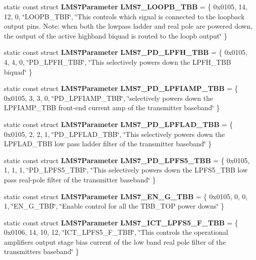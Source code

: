 \begin{DoxyCompactItemize}
\item 
static const struct {\bf L\+M\+S7\+Parameter} {\bf L\+M\+S7\+\_\+\+L\+O\+O\+P\+B\+\_\+\+T\+BB} = \{ 0x0105, 14, 12, 0, \char`\"{}\+L\+O\+O\+P\+B\+\_\+\+T\+B\+B\char`\"{}, \char`\"{}\+This controls which signal is connected to the loopback output pins. Note\+: when both the lowpass ladder and real pole are powered down, the output of the active highband biquad is routed to the loopb output\char`\"{} \}
\item 
static const struct {\bf L\+M\+S7\+Parameter} {\bf L\+M\+S7\+\_\+\+P\+D\+\_\+\+L\+P\+F\+H\+\_\+\+T\+BB} = \{ 0x0105, 4, 4, 0, \char`\"{}\+P\+D\+\_\+\+L\+P\+F\+H\+\_\+\+T\+B\+B\char`\"{}, \char`\"{}\+This selectively powers down the L\+P\+F\+H\+\_\+\+T\+B\+B biquad\char`\"{} \}
\item 
static const struct {\bf L\+M\+S7\+Parameter} {\bf L\+M\+S7\+\_\+\+P\+D\+\_\+\+L\+P\+F\+I\+A\+M\+P\+\_\+\+T\+BB} = \{ 0x0105, 3, 3, 0, \char`\"{}\+P\+D\+\_\+\+L\+P\+F\+I\+A\+M\+P\+\_\+\+T\+B\+B\char`\"{}, \char`\"{}selectively powers down the L\+P\+F\+I\+A\+M\+P\+\_\+\+T\+B\+B front-\/end current amp of the transmitter baseband\char`\"{} \}
\item 
static const struct {\bf L\+M\+S7\+Parameter} {\bf L\+M\+S7\+\_\+\+P\+D\+\_\+\+L\+P\+F\+L\+A\+D\+\_\+\+T\+BB} = \{ 0x0105, 2, 2, 1, \char`\"{}\+P\+D\+\_\+\+L\+P\+F\+L\+A\+D\+\_\+\+T\+B\+B\char`\"{}, \char`\"{}\+This selectively powers down the L\+P\+F\+L\+A\+D\+\_\+\+T\+B\+B low pass ladder filter of the transmitter baseband\char`\"{} \}
\item 
static const struct {\bf L\+M\+S7\+Parameter} {\bf L\+M\+S7\+\_\+\+P\+D\+\_\+\+L\+P\+F\+S5\+\_\+\+T\+BB} = \{ 0x0105, 1, 1, 1, \char`\"{}\+P\+D\+\_\+\+L\+P\+F\+S5\+\_\+\+T\+B\+B\char`\"{}, \char`\"{}\+This selectively powers down the L\+P\+F\+S5\+\_\+\+T\+B\+B low pass real-\/pole filter of the transmitter baseband\char`\"{} \}
\item 
static const struct {\bf L\+M\+S7\+Parameter} {\bf L\+M\+S7\+\_\+\+E\+N\+\_\+\+G\+\_\+\+T\+BB} = \{ 0x0105, 0, 0, 1, \char`\"{}\+E\+N\+\_\+\+G\+\_\+\+T\+B\+B\char`\"{}, \char`\"{}\+Enable control for all the T\+B\+B\+\_\+\+T\+O\+P power downs\char`\"{} \}
\item 
static const struct {\bf L\+M\+S7\+Parameter} {\bf L\+M\+S7\+\_\+\+I\+C\+T\+\_\+\+L\+P\+F\+S5\+\_\+\+F\+\_\+\+T\+BB} = \{ 0x0106, 14, 10, 12, \char`\"{}\+I\+C\+T\+\_\+\+L\+P\+F\+S5\+\_\+\+F\+\_\+\+T\+B\+B\char`\"{}, \char`\"{}\+This controls the operational amplifier\textquotesingle{}s output stage bias current of the low band real pole filter of the transmitter\textquotesingle{}s baseband\char`\"{} \}

\end{DoxyCompactItemize}
